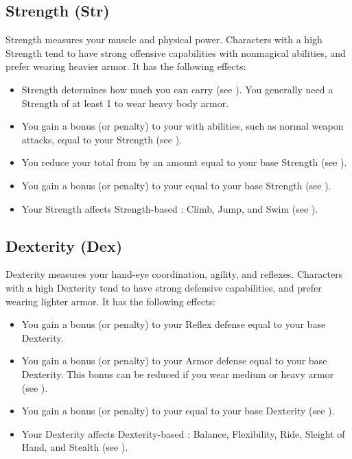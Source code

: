     \subsection{Strength (Str)}\label{Strength}
        {
            Strength measures your muscle and physical power.
            Characters with a high Strength tend to have strong offensive capabilities with nonmagical abilities, and prefer wearing heavier armor.
            It has the following effects:
            \begin{itemize}
                \item Strength determines how much you can carry (see ).
                    You generally need a Strength of at least 1 to wear heavy body armor.
                \item You gain a bonus (or penalty) to your  with  abilities, such as normal weapon attacks, equal to your Strength (see ).
                \item You reduce your total  from  by an amount equal to your base Strength (see ).
                \item You gain a bonus (or penalty) to your  equal to your base Strength (see ).
                \item Your Strength affects Strength-based : Climb, Jump, and Swim (see ).
            \end{itemize}
        }

    \subsection{Dexterity (Dex)}\label{Dexterity}
        {
            Dexterity measures your hand-eye coordination, agility, and reflexes.
            Characters with a high Dexterity tend to have strong defensive capabilities, and prefer wearing lighter armor.
            It has the following effects:
            \begin{itemize}
                \item You gain a bonus (or penalty) to your Reflex defense equal to your base Dexterity.
                \item You gain a bonus (or penalty) to your Armor defense equal to your base Dexterity.
                    This bonus can be reduced if you wear medium or heavy armor (see ).
                \item You gain a bonus (or penalty) to your  equal to your base Dexterity (see ).
                \item Your Dexterity affects Dexterity-based : Balance, Flexibility, Ride, Sleight of Hand, and Stealth (see ).
            \end{itemize}
        }

